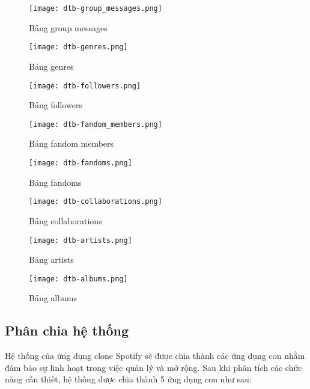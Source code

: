 \documentclass[a4paper]{article}
\begin{document}
\begin{figure}[!htb]
    \centering
    \texttt{[image: dtb-group\_messages.png]}
    \caption{Bảng group messages}
    \label{fig:enter-label}
\end{figure}

\begin{figure}[!htb]
    \centering
    \texttt{[image: dtb-genres.png]}
    \caption{Bảng genres}
    \label{fig:enter-label}
\end{figure}

\begin{figure}[!htb]
    \centering
    \texttt{[image: dtb-followers.png]}
    \caption{Bảng followers}
    \label{fig:enter-label}
\end{figure}

\begin{figure}[!htb]
    \centering
    \texttt{[image: dtb-fandom\_members.png]}
    \caption{Bảng fandom members}
    \label{fig:enter-label}
\end{figure}

\begin{figure}[!htb]
    \centering
    \texttt{[image: dtb-fandoms.png]}
    \caption{Bảng fandoms}
    \label{fig:enter-label}
\end{figure}


\begin{figure}[!htb]
    \centering
    \texttt{[image: dtb-collaborations.png]}
    \caption{Bảng collaborations}
    \label{fig:enter-label}
\end{figure}


\begin{figure}[!htb]
    \centering
    \texttt{[image: dtb-artists.png]}
    \caption{Bảng artists}
    \label{fig:enter-label}
\end{figure}


\begin{figure}[!htb]
    \centering
    \texttt{[image: dtb-albums.png]}
    \caption{Bảng albums}
    \label{fig:enter-label}
\end{figure}

\clearpage
\newpage
\subsection{Phân chia hệ thống}
Hệ thống của ứng dụng clone Spotify sẽ được chia thành các ứng dụng con nhằm đảm bảo sự linh hoạt trong việc quản lý và mở rộng. Sau khi phân tích các chức năng cần thiết, hệ thống được chia thành 5 ứng dụng con như sau:
\end{document}
